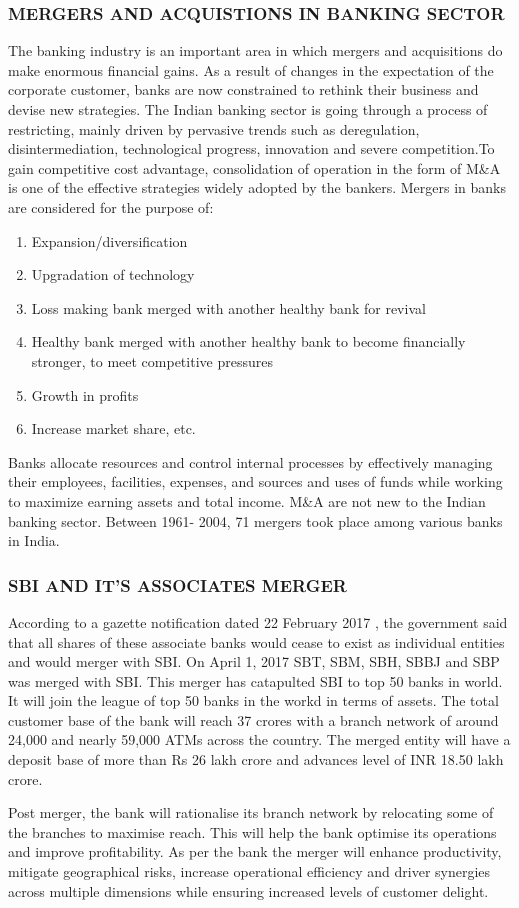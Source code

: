 \documentclass[a4paper, 12pt]{extarticle}
\begin{document}
{\subsubsection{MERGERS AND ACQUISTIONS IN BANKING SECTOR}
The banking industry is an important area in which mergers and acquisitions do make enormous financial gains. As a result of changes in the expectation of the corporate customer, banks are now constrained to rethink their business and devise new strategies. The Indian banking sector is going through a process of restricting, mainly driven by pervasive trends such as deregulation, disintermediation, technological progress, innovation and severe competition.To gain competitive cost advantage, consolidation of operation in the form of M\&A is one of the effective strategies widely adopted by the bankers. Mergers in banks are considered for the purpose of:
\begin{enumerate}
\item Expansion/diversification
\item Upgradation of technology
\item Loss making bank merged with another healthy bank for revival
\item Healthy bank merged with another healthy bank to become financially
stronger, to meet competitive pressures
\item Growth in profits
\item Increase market share, etc.
\end{enumerate}
Banks allocate resources and control internal processes by effectively
managing their employees, facilities, expenses, and sources and uses of funds while working to maximize earning assets and total income. M\&A are not new to the Indian banking sector. Between 1961- 2004, 71 mergers took place among various banks in India.
\subsubsection {SBI AND IT'S ASSOCIATES MERGER}
\par According to a gazette notification dated 22 February 2017 , the government said that all shares of these associate banks would cease to exist as individual entities and would merger with SBI. On April 1, 2017 SBT, SBM, SBH, SBBJ and SBP was merged with SBI. This merger has catapulted SBI to top 50 banks in world. It will join the league of top 50 banks in the workd in terms of assets. The total customer base of the bank will reach 37 crores with a branch network of around 24,000 and nearly 59,000 ATMs across the country. The merged entity will have a deposit base of more than Rs 26 lakh crore and advances level of INR 18.50 lakh crore.
\par Post merger, the bank will rationalise its branch network by relocating some of the branches to maximise reach. This will help the bank optimise its operations and improve profitability. As per the bank the merger will enhance productivity, mitigate geographical risks, increase operational efficiency and driver synergies across multiple dimensions while ensuring increased levels of customer delight.

}
\end{document}
